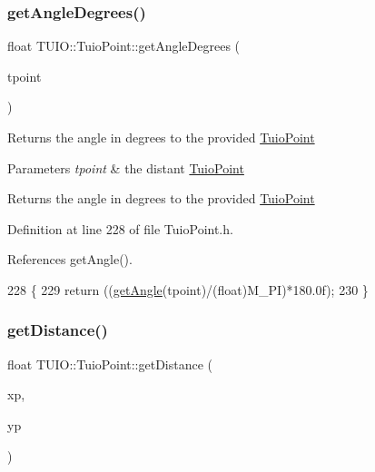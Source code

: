 \subsubsection{\texorpdfstring{get\+Angle\+Degrees()}{getAngleDegrees()}\hspace{0.1cm}{\footnotesize\ttfamily [2/2]}}
{\footnotesize\ttfamily float T\+U\+I\+O\+::\+Tuio\+Point\+::get\+Angle\+Degrees (\begin{DoxyParamCaption}\item[{\hyperlink{class_t_u_i_o_1_1_tuio_point}{Tuio\+Point} $\ast$}]{tpoint }\end{DoxyParamCaption})\hspace{0.3cm}{\ttfamily [inline]}}

Returns the angle in degrees to the provided \hyperlink{class_t_u_i_o_1_1_tuio_point}{Tuio\+Point}


\begin{DoxyParams}{Parameters}
{\em tpoint} & the distant \hyperlink{class_t_u_i_o_1_1_tuio_point}{Tuio\+Point} \\
\hline
\end{DoxyParams}
\begin{DoxyReturn}{Returns}
the angle in degrees to the provided \hyperlink{class_t_u_i_o_1_1_tuio_point}{Tuio\+Point} 
\end{DoxyReturn}


Definition at line 228 of file Tuio\+Point.\+h.



References get\+Angle().


\begin{DoxyCode}
228                                                  \{
229             \textcolor{keywordflow}{return} ((\hyperlink{class_t_u_i_o_1_1_tuio_point_ad4ca45ad0fdccc6f55b5af79189e7872}{getAngle}(tpoint)/(\textcolor{keywordtype}{float})M\_PI)*180.0f);
230         \}
\end{DoxyCode}
\mbox{\label{class_t_u_i_o_1_1_tuio_point_ab73aa4898ec2db72bd64b029473a8069}} 
\subsubsection{\texorpdfstring{get\+Distance()}{getDistance()}\hspace{0.1cm}{\footnotesize\ttfamily [1/2]}}
{\footnotesize\ttfamily float T\+U\+I\+O\+::\+Tuio\+Point\+::get\+Distance (\begin{DoxyParamCaption}\item[{float}]{xp,  }\item[{float}]{yp }\end{DoxyParamCaption})\hspace{0.3cm}{\ttfamily [inline]}}

